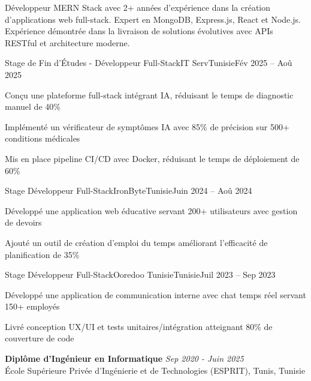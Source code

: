 \documentclass[11pt,a4paper]{article}
\begin{document}
\makecvheader
\makecontactinfo

Développeur MERN Stack avec 2+ années d'expérience dans la création d'applications web full-stack. Expert en MongoDB, Express.js, React et Node.js. Expérience démontrée dans la livraison de solutions évolutives avec APIs RESTful et architecture moderne.


\begin{internship}{Stage de Fin d'Études - Développeur Full-Stack}{IT Serv}{Tunisie}{Fév 2025 -- Aoû 2025}{}
  \item Conçu une plateforme full-stack intégrant IA, réduisant le temps de diagnostic manuel de 40\%
  \item Implémenté un vérificateur de symptômes IA avec 85\% de précision sur 500+ conditions médicales
  \item Mis en place pipeline CI/CD avec Docker, réduisant le temps de déploiement de 60\%
\end{internship}

\begin{internship}{Stage Développeur Full-Stack}{IronByte}{Tunisie}{Juin 2024 -- Aoû 2024}{}
  \item Développé une application web éducative servant 200+ utilisateurs avec gestion de devoirs
  \item Ajouté un outil de création d'emploi du temps améliorant l'efficacité de planification de 35\%
\end{internship}

\begin{internship}{Stage Développeur Full-Stack}{Ooredoo Tunisie}{Tunisie}{Juil 2023 -- Sep 2023}{}
  \item Développé une application de communication interne avec chat temps réel servant 150+ employés
  \item Livré conception UX/UI et tests unitaires/intégration atteignant 80\% de couverture de code
\end{internship}

\textbf{Diplôme d'Ingénieur en Informatique} \hfill \textit{Sep 2020 - Juin 2025}\\[-2pt]
École Supérieure Privée d'Ingénierie et de Technologies (ESPRIT), Tunis, Tunisie
\end{document}
